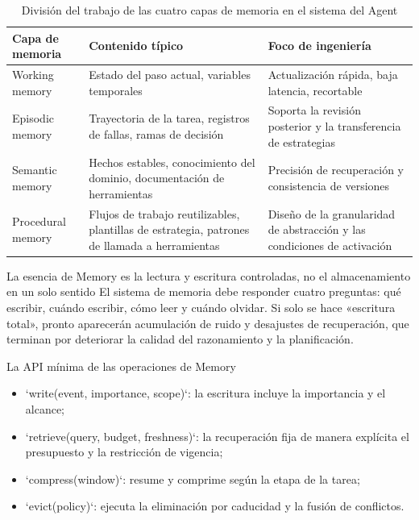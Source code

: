\documentclass[a4paper]{article}
\begin{document}
\begin{table}[H]
\centering
\begin{tabular}{p{2.8cm}p{3.6cm}p{4.8cm}}
\toprule
\textbf{Capa de memoria} & \textbf{Contenido típico} & \textbf{Foco de ingeniería} \\
\midrule
Working memory & Estado del paso actual, variables temporales & Actualización rápida, baja latencia, recortable \\
Episodic memory & Trayectoria de la tarea, registros de fallas, ramas de decisión & Soporta la revisión posterior y la transferencia de estrategias \\
Semantic memory & Hechos estables, conocimiento del dominio, documentación de herramientas & Precisión de recuperación y consistencia de versiones \\
Procedural memory & Flujos de trabajo reutilizables, plantillas de estrategia, patrones de llamada a herramientas & Diseño de la granularidad de abstracción y las condiciones de activación \\
\bottomrule
\end{tabular}
\caption{División del trabajo de las cuatro capas de memoria en el sistema del Agent}
\end{table}

\begin{importantbox}{La esencia de Memory es la lectura y escritura controladas, no el almacenamiento en un solo sentido}
El sistema de memoria debe responder cuatro preguntas: qué escribir, cuándo escribir, cómo leer y cuándo olvidar. Si solo se hace «escritura total», pronto aparecerán acumulación de ruido y desajustes de recuperación, que terminan por deteriorar la calidad del razonamiento y la planificación.
\end{importantbox}

\begin{knowledgebox}{La API mínima de las operaciones de Memory}
\begin{itemize}
    \item `write(event, importance, scope)`: la escritura incluye la importancia y el alcance;
    \item `retrieve(query, budget, freshness)`: la recuperación fija de manera explícita el presupuesto y la restricción de vigencia;
    \item `compress(window)`: resume y comprime según la etapa de la tarea;
    \item `evict(policy)`: ejecuta la eliminación por caducidad y la fusión de conflictos.
\end{itemize}
\end{knowledgebox}
\end{document}
